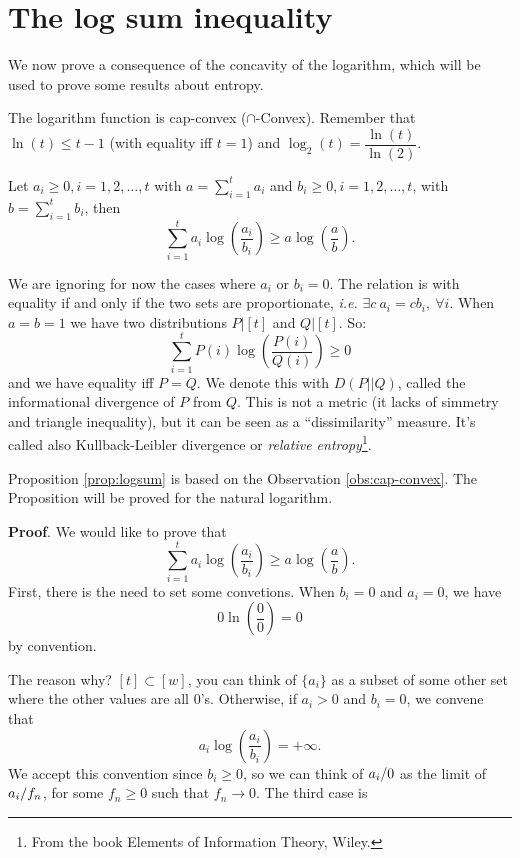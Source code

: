 \chapter{The log sum inequality}
We now prove a consequence of the concavity of the logarithm, which will be used to prove some results about entropy.

\begin{obs}\label{obs:cap-convex}
	The logarithm function is cap-convex ($\cap$-Convex). Remember that $\ln(t) \leq t - 1$ (with equality iff $t=1$) and $\log_2(t) = \dfrac{\ln(t)}{\ln(2)}$.
	
\end{obs}

\begin{prop}\label{prop:logsum}
	Let $a_i \geq 0, i = 1, 2, \ldots, t$ with $a = \sum_{i = 1}^t a_i$ and $b_i \geq 0, i = 1, 2, \ldots, t$, with $b = \sum_{i = 1}^t b_i$, then 
	\begin{equation}
	 \sum_{i= 1}^ta_i\log\left(\dfrac{a_i}{b_i}\right)\geq a\log\left(\dfrac{a}{b}\right).
	\end{equation}
\end{prop}

We are ignoring for now the cases where $a_i$ or $b_i = 0$. The relation is with equality if and only if  the two sets are proportionate, \emph{i.e.} $\exists c\ a_i = cb_i,\ \forall i$. When $a = b = 1$ we have two distributions $P|[t]$ and $Q|[t]$. So:
\begin{equation}
\sum_{i = 1}^tP(i)\log\left(\dfrac{P(i)}{Q(i)}\right)\geq 0
\end{equation}
 and we have equality iff $P = Q$. We denote this with $D(P||Q)$, called the informational divergence of $P$ from $Q$. This is not a metric (it lacks of simmetry and triangle inequality), but it can be seen as a ``dissimilarity'' measure. It's called also Kullback-Leibler divergence or \emph{relative entropy}\footnote{From the book Elements of Information Theory, Wiley.}. 
 
 Proposition \ref{prop:logsum} is based on the Observation \ref{obs:cap-convex}. The Proposition will be proved for the natural logarithm.
 
 \noindent\textbf{Proof}. We would like to prove that $$\sum_{i= 1}^ta_i\log\left(\dfrac{a_i}{b_i}\right)\geq a\log\left(\dfrac{a}{b}\right).$$First, there is the need to set some convetions. When $b_i = 0$ and $a_i = 0$, we have $$0\ln(\dfrac{0}{0}) = 0$$ by convention.
 
 The reason why? $[t] \subset [w]$, you can think of $\{a_i\}$ as a subset of some other set where the other values are all $0$'s. Otherwise, if $a_i > 0$ and $b_i = 0$, we convene that $$a_i\log\left(\dfrac{a_i}{b_i}\right) = +\infty.$$ We accept this convention since $b_i \geq 0$, so we can think of ${a_i}/{0}$ as the limit of ${a_i}/{f_n}$, for some $f_n\geq 0$ such that $f_n \rightarrow 0$. The third case is
 
